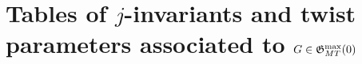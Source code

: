 \chapter{Tables of $j$-invariants and twist parameters associated to $G \in \mathfrak{G}_{MT}^{\max}(0)$} \label{tablesection}


